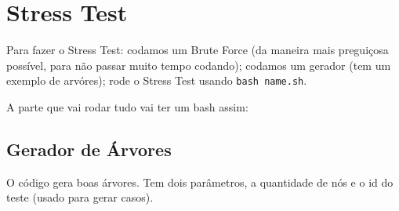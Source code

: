 \section{Stress Test}
     Para fazer o Stress Test: codamos um Brute Force (da maneira mais preguiçosa possível, para não passar muito tempo codando); codamos um gerador (tem um exemplo de arvóres); rode o Stress Test usando \texttt{bash name.sh}.

    A parte que vai rodar tudo vai ter um bash assim:
    
    \subsection{Gerador de Árvores}
    O código gera boas árvores. Tem dois parâmetros, a quantidade de nós e o id do teste (usado para gerar casos).
